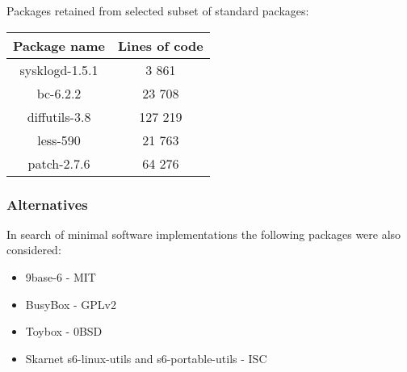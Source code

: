 Packages retained from selected subset of standard packages:

\begin{center}
    \begin{tabular}{|c||c|}
        \hline
        Package name & Lines of code \\
        \hline
        \hline
        sysklogd-1.5.1 & 3 861 \\
        \hline
        bc-6.2.2 & 23 708 \\
        \hline        
        diffutils-3.8 & 127 219 \\
        \hline
        less-590 & 21 763 \\
        \hline
        patch-2.7.6 & 64 276 \\
        \hline
    \end{tabular}
\end{center}

\subsubsection{Alternatives}

In search of minimal software implementations the following packages were also considered:

\begin{itemize}
    \item 9base-6 \cite{9base} - MIT
    \item BusyBox \cite{busybox} - GPLv2
    \item Toybox \cite{toybox} - 0BSD
    \item Skarnet s6-linux-utils \cite{s6-linux} and s6-portable-utils \cite{s6-portable} - ISC
\end{itemize}
